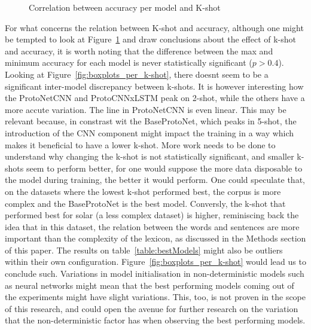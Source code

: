 \documentclass[manuscript, anonymous=true, review=true]{acmart}
\begin{document}
\begin{figure}[h]
  \centering
  \resizebox{.6\linewidth}{!}{}
  \caption{Correlation between accuracy per model and K-shot}
    \label{fig:regressionLine_k-shot}
\end{figure}

For what concerns the relation between K-shot and accuracy, although one might be tempted to look at Figure~\ref{fig:regressionLine_k-shot} and draw conclusions about the effect of k-shot and accuracy,
it is worth noting that the difference between the max and minimum accuracy for each model is never statistically significant (\( p>0.4\)). Looking at Figure~\ref{fig:boxplots_per_k-shot}, there doesnt seem to be a significant inter-model discrepancy between k-shots. 
It is however interesting how the ProtoNetCNN and ProtoCNNxLSTM peak on 2-shot, while the others have a more accute variation. The line in ProtoNetCNN is even linear. This may be relevant because, in constrast wit the BaseProtoNet, which peaks in 5-shot, the introduction of the CNN component might impact the training in a way which makes it beneficial to have a lower k-shot.
More work needs to be done to understand 
why changing the k-shot is not statistically significant, and smaller k-shots seem to perform better, for one would suppose the more data disposable to the model during training, the better it would perform.
One could speculate that, on the datasets where the lowest k-shot performed best, the corpus is more complex and the BaseProtoNet is the best model. Conversly, the k-shot that performed best for solar (a less complex dataset) is higher, reminiscing back the idea that in this dataset, the relation between the words and sentences are more important than the complexity of the lexicon, as discussed in the Methods section of this paper. 
The results on table~\ref{table:bestModels} might also be outliers within their own configuration. Figure~\ref{fig:boxplots_per_k-shot} would lead us to conclude such. Variations in model initialisation in non-deterministic models such as neural networks might mean that the best performing models coming out of the experiments might have slight variations.
This, too, is not proven in the scope of this research, and could open the avenue for further research on the variation that the non-deterministic factor has when observing the best performing models. 
\end{document}
